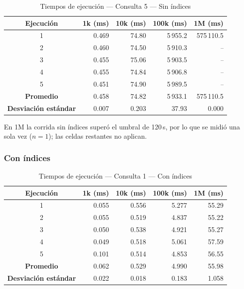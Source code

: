 \begin{table}[H]
\centering
\small
\caption{Tiempos de ejecución --- Consulta 5 --- Sin índices}
\begin{tabular}{|c|r|r|r|r|}
\hline
\textbf{Ejecución} & \textbf{1k (ms)} & \textbf{10k (ms)} & \textbf{100k (ms)} & \textbf{1M (ms)} \\ \hline
1 & 0.469 & 74.80 & 5\,955.2 & 575\,110.5 \\ \hline
2 & 0.460 & 74.50 & 5\,910.3 & \textit{--} \\ \hline
3 & 0.455 & 75.06 & 5\,903.5 & \textit{--} \\ \hline
4 & 0.455 & 74.84 & 5\,906.8 & \textit{--} \\ \hline
5 & 0.451 & 74.90 & 5\,989.5 & \textit{--} \\ \hline
\textbf{Promedio} & 0.458 & 74.82 & 5\,933.1 & 575\,110.5 \\ \hline
\textbf{Desviación estándar} & 0.007 & 0.203 & 37.93 & 0.000 \\ \hline
\end{tabular}
\par\footnotesize En 1M la corrida sin índices superó el umbral de 120\,s, por lo que se midió una sola vez ($n=1$); las celdas restantes no aplican.
\end{table}


\subsubsection{Con índices}

\begin{table}[H]
\centering
\small
\caption{Tiempos de ejecución --- Consulta 1 --- Con índices}
\begin{tabular}{|c|r|r|r|r|}
\hline
\textbf{Ejecución} & \textbf{1k (ms)} & \textbf{10k (ms)} & \textbf{100k (ms)} & \textbf{1M (ms)} \\ \hline
1 & 0.055 & 0.556 & 5.277 & 55.29 \\ \hline
2 & 0.055 & 0.519 & 4.837 & 55.22 \\ \hline
3 & 0.050 & 0.538 & 4.921 & 55.27 \\ \hline
4 & 0.049 & 0.518 & 5.061 & 57.59 \\ \hline
5 & 0.101 & 0.514 & 4.853 & 56.55 \\ \hline
\textbf{Promedio} & 0.062 & 0.529 & 4.990 & 55.98 \\ \hline
\textbf{Desviación estándar} & 0.022 & 0.018 & 0.183 & 1.058 \\ \hline
\end{tabular}

\end{table}

